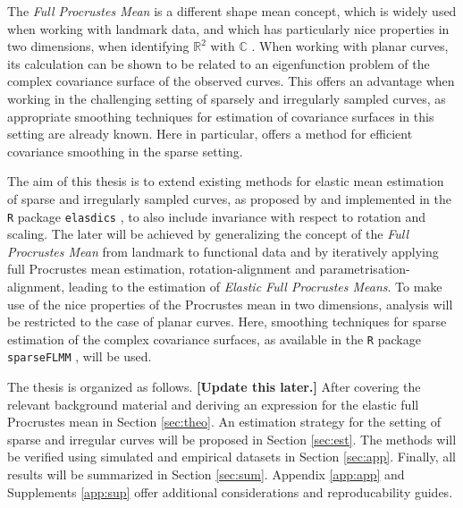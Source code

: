 The \textit{Full Procrustes Mean} is a different shape mean concept, which is widely used when working with landmark data, and which has particularly nice properties in two dimensions, when identifying $\mathbb{R}^2$ with $\mathbb{C}$ \parencite[see][Chap.\ 8]{DrydenMardia2016}.
When working with planar curves, its calculation can be shown to be related to an eigenfunction problem of the complex covariance surface of the observed curves.
This offers an advantage when working in the challenging setting of sparsely and irregularly sampled curves, as appropriate smoothing techniques for estimation of covariance surfaces in this setting are already known.
Here in particular, \cite{CederbaumScheiplGreven2018} offers a method for efficient covariance smoothing in the sparse setting. 

The aim of this thesis is to extend existing methods for elastic mean estimation of sparse and irregularly sampled curves, as proposed by \cite{Steyer2021} and implemented in the \texttt{R} package \texttt{elasdics} \parencite{elasdics}, to also include invariance with respect to rotation and scaling.
The later will be achieved by generalizing the concept of the \textit{Full Procrustes Mean} from landmark to functional data and by iteratively applying full Procrustes mean estimation, rotation-alignment and parametrisation-alignment, leading to the estimation of \textit{Elastic Full Procrustes Means}.
To make use of the nice properties of the Procrustes mean in two dimensions, analysis will be restricted to the case of planar curves.
Here, smoothing techniques for sparse estimation of the complex covariance surfaces, as available in the \texttt{R} package \texttt{sparseFLMM} \parencite{sparseFLMM}, will be used.

The thesis is organized as follows. 
\textbf{[Update this later.]}
After covering the relevant background material and deriving an expression for the elastic full Procrustes mean in Section \ref{sec:theo}.
An estimation strategy for the setting of sparse and irregular curves will be proposed in Section \ref{sec:est}.
The methods will be verified using simulated and empirical datasets in Section \ref{sec:app}.
Finally, all results will be summarized in Section \ref{sec:sum}.
Appendix \ref{app:app} and Supplements \ref{app:sup} offer additional considerations and reproducability guides.

\newpage

